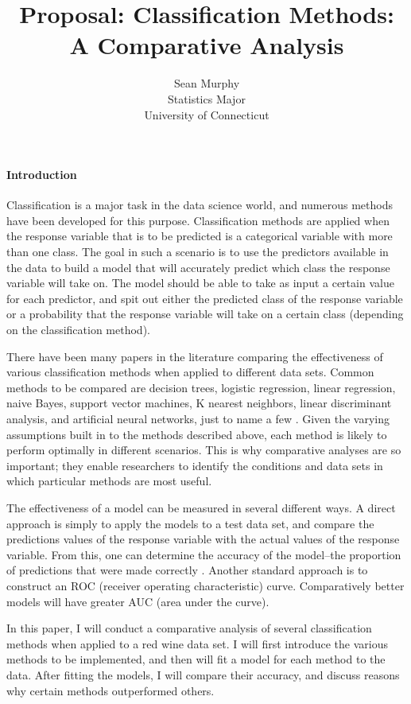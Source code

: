\documentclass[12pt]{article}
\title{Proposal: Classification Methods: A Comparative Analysis}
\author{Sean Murphy\\
  Statistics Major\\
  University of Connecticut
}
\begin{document}
\maketitle


\paragraph{Introduction}

Classification is a major task in the data science world, 
and numerous methods have been developed for this purpose.  
Classification methods are applied when the response variable 
that is to be predicted is a categorical variable with more 
than one class.  The goal in such a scenario is to use the 
predictors available in the data to build a model that will 
accurately predict which class the response variable will take 
on.  The model should be able to take as input a certain value 
for each predictor, and spit out either the predicted class of 
the response variable or a probability that the response variable 
will take on a certain class (depending on the classification method).    

There have been many papers in the literature comparing the effectiveness 
of various classification methods when applied to different data sets.  
Common methods to be compared are decision trees, logistic regression, 
linear regression, naive Bayes, support vector machines, K nearest neighbors, 
linear discriminant analysis, and artificial neural networks, just to name 
a few \citep{entezari2009comparison}.  Given the varying assumptions built 
in to the methods described above, each method is likely to perform optimally 
in different scenarios.  This is why comparative analyses are so important; 
they enable researchers to identify the conditions and data sets in which 
particular methods are most useful. 

The effectiveness of a model can be measured in several different ways.  
A direct approach is simply to apply the models to a test data set, and 
compare the predictions values of the response variable with the actual 
values of the response variable.  From this, one can determine the accuracy 
of the model--the proportion of predictions that were made correctly 
\citep{barnaghi2012comparative}.  Another standard approach is to construct 
an ROC (receiver operating characteristic) curve.  Comparatively better 
models will have greater AUC (area under the curve).

In this paper, I will conduct a comparative analysis of several classification
methods when applied to a red wine data set.  I will first introduce the 
various methods to be implemented, and then will fit a model for each method 
to the data.  After fitting the models, I will compare their accuracy, and 
discuss reasons why certain methods outperformed others.  
\end{document}
